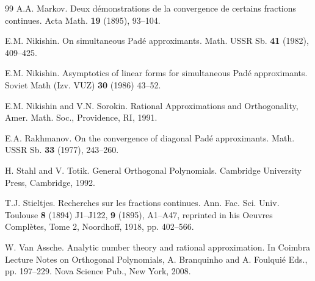 \documentclass[10pt,a4paper]{article}
\theoremstyle{definition}
\theoremstyle{remark}
\numberwithin{equation}{section}
\begin{document}
\begin{thebibliography}{99}
 A.A. Markov. Deux d\'emonstrations de la convergence de certains fractions continues. Acta Math. {\bf 19} (1895), 93--104.

 E.M. Nikishin. On simultaneous Pad\'e approximants. Math. USSR Sb. {\bf 41} (1982), 409--425.

 E.M. Nikishin. Asymptotics of linear forms for simultaneous Pad\'e approximants. Soviet Math (Izv. VUZ) {\bf 30} (1986) 43--52.

E.M. Nikishin and V.N. Sorokin. Rational Approximations and Orthogonality,
Amer. Math. Soc., Providence, RI, 1991.

  E.A. Rakhmanov.
On the convergence of diagonal Pad\'e approximants.   Math. USSR Sb. {\bf 33} (1977), 243--260.

 H. Stahl and V. Totik.   General Orthogonal
Polynomials. Cambridge University Press, Cambridge, 1992.

 T.J. Stieltjes. Recherches sur les fractions continues. Ann. Fac. Sci. Univ. Toulouse {\bf 8} (1894) J1--J122, {\bf 9} (1895), A1--A47, reprinted in his Oeuvres Compl\`{e}tes, Tome 2, Noordhoff, 1918, pp. 402--566.


  W. Van Assche. Analytic number theory and rational approximation. In Coimbra Lecture Notes on Orthogonal Polynomials, A. Branquinho and A. Foulqui\'{e} Eds., pp. 197--229. Nova Science Pub., New York, 2008.

\end{thebibliography}
\end{document}
